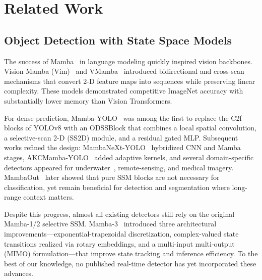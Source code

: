 
\section{Related Work}
\label{sec:related}

\subsection{Object Detection with State Space Models}
The success of Mamba~\cite{gu2023mamba} in language modeling quickly inspired vision backbones. Vision Mamba (Vim)~\cite{zhu2024vision} and VMamba~\cite{liu2024vmamba} introduced bidirectional and cross-scan mechanisms that convert 2-D feature maps into sequences while preserving linear complexity. These models demonstrated competitive ImageNet accuracy with substantially lower memory than Vision Transformers.

For dense prediction, Mamba-YOLO~\cite{wang2025mambayolo} was among the first to replace the C2f blocks of YOLOv8 with an ODSSBlock that combines a local spatial convolution, a selective-scan 2-D (SS2D) module, and a residual gated MLP. Subsequent works refined the design: MambaNeXt-YOLO~\cite{lei2025mambanext} hybridized CNN and Mamba stages, AKCMamba-YOLO~\cite{chen2026akcmamba} added adaptive kernels, and several domain-specific detectors appeared for underwater~\cite{spmamba2026}, remote-sensing, and medical imagery. MambaOut~\cite{yu2025mambaout} later showed that pure SSM blocks are not necessary for classification, yet remain beneficial for detection and segmentation where long-range context matters.

Despite this progress, almost all existing detectors still rely on the original Mamba-1/2 selective SSM. Mamba-3~\cite{lahoti2026mamba3} introduced three architectural improvements—exponential-trapezoidal discretization, complex-valued state transitions realized via rotary embeddings, and a multi-input multi-output (MIMO) formulation—that improve state tracking and inference efficiency. To the best of our knowledge, no published real-time detector has yet incorporated these advances.

